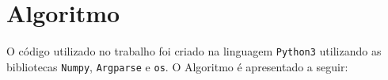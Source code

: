 %
%
%
%
%
\chapter{Algoritmo}
\label{apend:algoritmo}
O código utilizado no trabalho foi criado na linguagem \texttt{Python3} utilizando as bibliotecas \texttt{Numpy}, \texttt{Argparse} e \texttt{os}. O Algoritmo é apresentado a seguir:

\hrulefill



%
%
%
